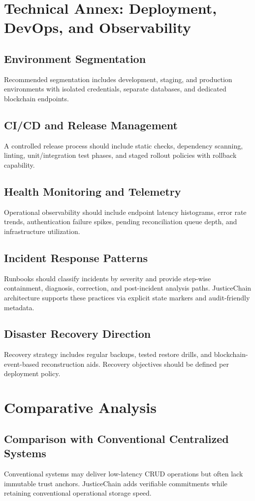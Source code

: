 \documentclass[conference]{IEEEtran}
\begin{document}
\section{Technical Annex: Deployment, DevOps, and Observability}
\subsection{Environment Segmentation}
Recommended segmentation includes development, staging, and production environments with isolated credentials, separate databases, and dedicated blockchain endpoints.

\subsection{CI/CD and Release Management}
A controlled release process should include static checks, dependency scanning, linting, unit/integration test phases, and staged rollout policies with rollback capability.

\subsection{Health Monitoring and Telemetry}
Operational observability should include endpoint latency histograms, error rate trends, authentication failure spikes, pending reconciliation queue depth, and infrastructure utilization.

\subsection{Incident Response Patterns}
Runbooks should classify incidents by severity and provide step-wise containment, diagnosis, correction, and post-incident analysis paths. JusticeChain architecture supports these practices via explicit state markers and audit-friendly metadata.

\subsection{Disaster Recovery Direction}
Recovery strategy includes regular backups, tested restore drills, and blockchain-event-based reconstruction aids. Recovery objectives should be defined per deployment policy.

\section{Comparative Analysis}
\subsection{Comparison with Conventional Centralized Systems}
Conventional systems may deliver low-latency CRUD operations but often lack immutable trust anchors. JusticeChain adds verifiable commitments while retaining conventional operational storage speed.
\end{document}

